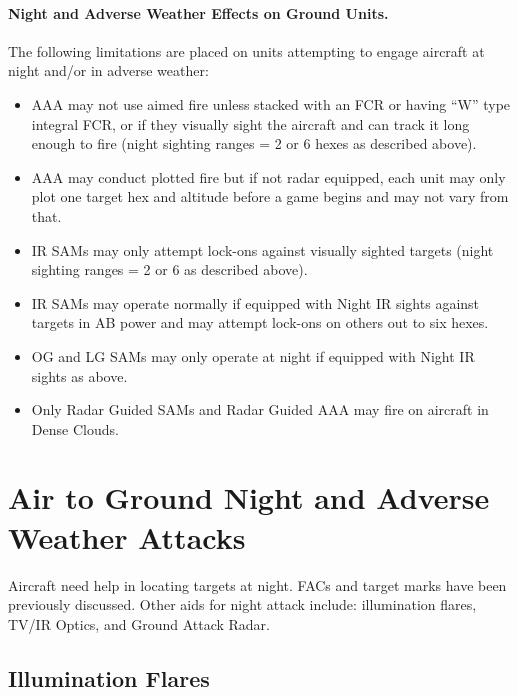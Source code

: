 \begin{advancedrules}
\paragraph{Night and Adverse Weather Effects on Ground Units.} The following limitations are placed on units attempting to engage aircraft at night and/or in adverse weather:

\begin{itemize}

    \item AAA may not use aimed fire unless stacked with an FCR or having “W” type integral FCR, or if they visually sight the aircraft and can track it long enough to fire (night sighting ranges = 2 or 6 hexes as described above).

    \item AAA may conduct plotted fire but if not radar equipped, each unit may only plot one target hex and altitude before a game begins and may not vary from that.

    \item IR SAMs may only attempt lock-ons against visually sighted targets (night sighting ranges = 2 or 6 as described above).

    \item IR SAMs may operate normally if equipped with Night IR sights against targets in AB power and may attempt lock-ons on others out to six hexes.

    \item OG and LG SAMs may only operate at night if equipped with Night IR sights as above.

    \item Only Radar Guided SAMs and Radar Guided AAA may fire on aircraft in Dense Clouds.

\end{itemize}

\section{Air to Ground Night and Adverse Weather Attacks}

Aircraft need help in locating targets at night. FACs and target marks have been previously discussed. Other aids for night attack include: illumination flares, TV/IR Optics, and Ground Attack Radar.

\subsection{Illumination Flares}


\end{advancedrules}
